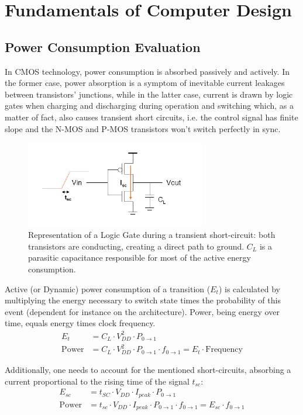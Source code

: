 \chapter{Fundamentals of Computer Design}

\section{Power Consumption Evaluation}
In CMOS technology, power consumption is absorbed passively and actively. In the former case, power absorption is a symptom of inevitable current leakages between transistors' junctions, while in the latter case, current is drawn by logic gates when charging and discharging during operation and switching which, as a matter of fact, also causes transient short circuits, i.e. the control signal has finite slope and the N-MOS and P-MOS transistors won't switch perfectly in sync. 

\begin{figure}[htbp]
    \centering
    \includegraphics[width=0.7\textwidth]{images/logic_gate_1}
    \caption{Representation of a Logic Gate during a transient short-circuit: both transistors are conducting, creating a direct path to ground. $C_L$ is a parasitic capacitance responsible for most of the active energy consumption.}
    \label{fig:my_label}
\end{figure}

Active (or Dynamic) power consumption of a transition ($E_t$) is calculated by multiplying the energy necessary to switch state times the probability of this event (dependent for instance on the architecture). Power, being energy over time, equals energy times clock frequency.
\begin{align*}
E_t &= C_L \cdot V_{DD}^2 \cdot P_{0 \rightarrow 1} \\
\textrm{Power} &= C_L \cdot V_{DD}^2 \cdot P_{0 \rightarrow 1} \cdot f_{0 \rightarrow 1} = E_t \cdot \textrm{Frequency}
\end{align*}

Additionally, one needs to account for the mentioned short-circuits, absorbing a current proportional to the rising time of the signal $t_{sc}$:
\begin{align*}
E_{sc} &= t_{SC} \cdot V_{DD} \cdot I_{peak} \cdot P_{0 \rightarrow 1} \\
\textrm{Power} &= t_{sc} \cdot V_{DD} \cdot I_{peak} \cdot P_{0 \rightarrow 1} \cdot f_{0 \rightarrow 1} = E_{sc} \cdot f_{0 \rightarrow 1}
\end{align*}


